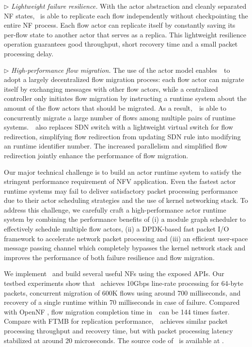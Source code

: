 $\triangleright$ {\em Lightweight failure resilience.} With the actor abstraction and cleanly separated NF states, \nfactor~is able to replicate each flow independently without checkpointing the entire NF process. Each flow actor can replicate itself by constantly saving its per-flow state to another actor that serves as a replica.
This lightweight resilience operation guarantees good throughput, short recovery time and a small packet processing delay.

$\triangleright$ {\em High-performance flow migration.} The use of the actor model enables~\nfactor~to adopt a largely decentralized flow migration process: each flow actor can migrate itself by exchanging messages with other flow actors, while a centralized controller only initiates flow migration by instructing a runtime system about the amount of the flow actors that should be migrated. As a result,~\nfactor~is able to concurrently migrate a large number of flows among multiple pairs of runtime systems.~\nfactor~also replaces SDN switch with a lightweight virtual switch for flow redirection, simplifying flow redirection from updating SDN rule into modifying an runtime identifier number. %
The increased parallelism and simplified flow redirection jointly enhance the performance of flow migration.

Our major technical challenge is to build an actor runtime system to satisfy the stringent performance requirement of NFV application. Even the fastest actor runtime systems \cite{chs-rapc-16} may fail to deliver satisfactory packet processing performance due to their actor scheduling strategies and the use of kernel networking stack. To address this challenge, we carefully craft a high-performance actor runtime system by combining the performance benefits of (i) a module graph scheduler to effectively schedule multiple flow actors, (ii) a DPDK-based \cite{dpdk} fast packet I/O framework \cite{bess} to accelerate network packet processing and (iii) an efficient user-space message passing channel which completely bypasses the kernel network stack and improves the performance of both failure resilience and flow migration.

We implement \nfactor~and build several useful NFs using the exposed APIs. Our testbed experiments show that \nfactor~achieves 10Gbps line-rate processing for 64-byte packets, concurrent migration of 600K flows using around 700 milliseconds, and recovery of a single runtime within 70 milliseconds in case of failure. Compared with OpenNF \cite{gember2015opennf}, flow migration completion time in~\nfactor~can be 144 times faster. Compare with FTMB \cite{sherry2015rollback} for replication performance,~\nfactor~achieves similar packet processing throughput and recovery time, but with packet processing latency stabilized at around 20 microseconds. The source code of \nfactor~is available at \cite{projectcode}.

